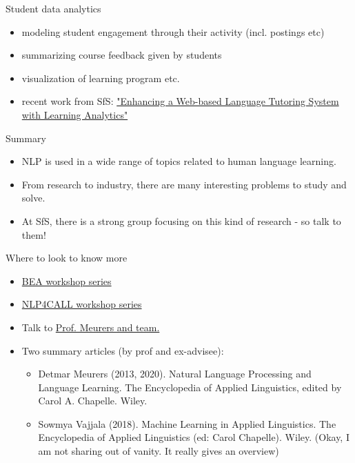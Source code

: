 \documentclass{beamer}
\begin{document}
\begin{frame}{Student data analytics}
    \begin{itemize}
        \item modeling student engagement through their activity (incl. postings etc)
        \item summarizing course feedback given by students
        \item visualization of learning program etc. 
        \item recent work from SfS: \href{http://ceur-ws.org/Vol-2592/paper1.pdf}{"Enhancing a Web-based Language Tutoring System with
Learning Analytics"}
    \end{itemize}
\end{frame}

\begin{frame}{Summary}
    \begin{itemize}
        \item NLP is used in a wide range of topics related to human language learning.
        \item From research to industry, there are many interesting problems to study and solve.
        \item At SfS, there is a strong group focusing on this kind of research - so talk to them!
    \end{itemize}
\end{frame}

\begin{frame}{Where to look to know more}
\begin{itemize}
    \item \href{https://www.aclweb.org/anthology/venues/bea/}{BEA workshop series}
    \item \href{https://www.aclweb.org/anthology/venues/nlp4call/}{NLP4CALL workshop series}
    \item Talk to \href{http://www.sfs.uni-tuebingen.de/icall/}{Prof. Meurers and team.} 
    \item Two summary articles (by prof and ex-advisee):
    \begin{itemize}
        \item Detmar Meurers (2013, 2020). Natural Language Processing and Language Learning. The Encyclopedia of Applied Linguistics, edited by Carol A. Chapelle. Wiley. 
        \item Sowmya Vajjala (2018). Machine Learning in Applied Linguistics. The Encyclopedia of Applied Linguistics (ed: Carol Chapelle). Wiley. (\footnotesize{Okay, I am not sharing out of vanity. It really gives an overview)} 
    \end{itemize}
\end{itemize}    
\end{frame}
\end{document}
